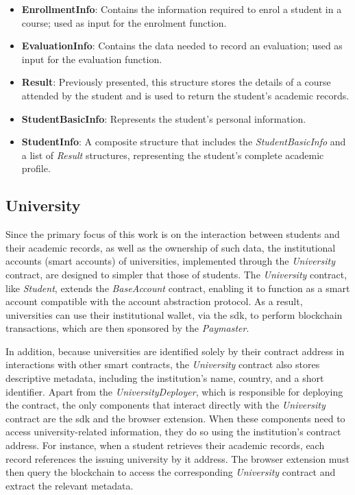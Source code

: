 \begin{itemize}
    \item \textbf{EnrollmentInfo}: Contains the information required to enrol a student in a course; used as input for the enrolment function.
    \item \textbf{EvaluationInfo}: Contains the data needed to record an evaluation; used as input for the evaluation function.
    \item \textbf{Result}: Previously presented, this structure stores the details of a course attended by the student and is used to return the student's academic records.
    \item \textbf{StudentBasicInfo}: Represents the student's personal information.
    \item \textbf{StudentInfo}: A composite structure that includes the \textit{StudentBasicInfo} and a list of \textit{Result} structures, representing the student’s complete academic profile.
\end{itemize}

\subsection{University}
Since the primary focus of this work is on the interaction between students and their academic records, as well as the ownership of such data, the institutional accounts (smart accounts) of universities, implemented through the \textit{University} contract, are designed to simpler that those of students. The \textit{University} contract, like \textit{Student}, extends the \textit{BaseAccount} contract, enabling it to function as a smart account compatible with the account abstraction protocol. As a result, universities can use their institutional wallet, via the \acrshort{sdk}, to perform blockchain transactions, which are then sponsored by the \textit{Paymaster}. 

In addition, because universities are identified solely by their contract address in interactions with other smart contracts, the \textit{University} contract also stores descriptive metadata, including the institution's name, country, and a short identifier. Apart from the \textit{UniversityDeployer}, which is responsible for deploying the contract, the only components that interact directly with the \textit{University} contract are the \acrshort{sdk} and the browser extension. When these components need to access university-related information, they do so using the institution's contract address. For instance, when a student retrieves their academic records, each record references the issuing university by it address. The browser extension must then query the blockchain to access the corresponding \textit{University} contract and extract the relevant metadata.    


